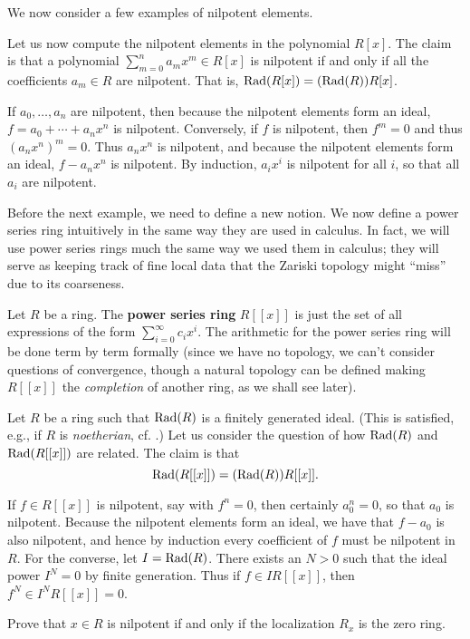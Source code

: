 We now consider a few examples of nilpotent elements.
\begin{example}
Let us now compute the nilpotent elements in the polynomial $R[x]$.
The claim is that a polynomial $\sum_{m=0}^n a_m x^m \in R[x]$ is nilpotent if
and only
if all the coefficients $a_m \in R$ are nilpotent. That is, $\operatorname{Rad}(R[x]) =
(\operatorname{Rad}(R))R[x]$.

If $a_0,\ldots,a_n$ are nilpotent, then because the nilpotent
elements form an ideal, $f=a_0+\cdots+a_nx^n$ is nilpotent. Conversely,
if $f$ is nilpotent, then $f^m=0$ and thus $(a_nx^n)^m=0$. Thus $a_nx^n$
is nilpotent, and because the nilpotent elements form an ideal, $f-a_nx^n$
is nilpotent. By induction, $a_ix^i$ is nilpotent for all $i$, so that all
$a_i$ are nilpotent.
\end{example} 

Before the next example, we need to define a new notion.
We now define a power series ring intuitively in the same way they are used in
calculus. In fact, we will use power series rings much the same way we used them
in calculus; they will serve as keeping track of fine local data that the
Zariski topology might ``miss'' due to its coarseness.
\begin{definition} Let $R$ be a ring. The \textbf{power series ring} $R[[x]]$ is just the set of all
expressions of the form $\sum_{i=0}^\infty c_i x^i$. The arithmetic for the
power series ring will be done term by term formally (since we have no topology,
we can't consider questions of convergence, though a natural topology can be
defined making $R[[x]]$ the \emph{completion} of another ring, as we shall
see later). \end{definition}




\begin{example}
Let $R$ be  a ring such that $\operatorname{Rad}(R)$ is a finitely generated ideal. (This is
satisfied, e.g., if $R$ is \emph{noetherian}, cf. .)
Let us consider the question of how $\operatorname{Rad}(R)$ and $\operatorname{Rad}(R[[x]])$ are related.
The claim is that
\[ \operatorname{Rad}(R[[x]]) = (\operatorname{Rad}(R))R[[x]].  \]

If $f\in R[[x]]$ is nilpotent, say with $f^n=0$, then
certainly $a_0^n=0$, so that $a_0$ is nilpotent. Because the nilpotent elements
form an ideal, we have that $f-a_0$ is also nilpotent, and hence by induction
every coefficient of $f$ must be nilpotent in $R$. 
For the converse, let $I =
\operatorname{Rad}(R)$. There
exists an $N>0$ such that the ideal power $I^N  = 0$ by finite generation. 
Thus if $f \in IR[[x]]$, then $f^N \in I^N R[[x]] = 0$.
\end{example} 
\begin{exercise} \label{nilpcriterion} 
Prove that $x \in R$ is nilpotent if and only if the localization $R_x$ is the
zero ring.
\end{exercise} 

